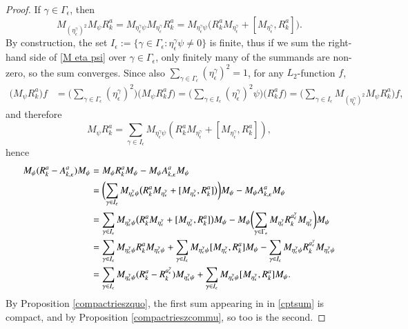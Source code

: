 \documentclass[leqno]{amsart}
\begin{document}
	\begin{proof}
		If $\gamma\in\Gamma_\epsilon$, then
		\begin{equation}\label{M eta psi}
			M_{(\eta^\gamma_\epsilon)^{2}}M_{\psi}R^a_k
			=M_{\eta^\gamma_\epsilon\psi}M_{\eta^\gamma_\epsilon}R^a_k=M_{\eta^\gamma_\epsilon\psi}\bigl(R^a_kM_{\eta^\gamma_\epsilon}+[M_{\eta^\gamma_\epsilon},R^a_k]\bigr).
		\end{equation}
		By construction, the set $I_\epsilon:=\{\gamma\in\Gamma_\epsilon : \eta^\gamma_\epsilon\psi\neq 0\}$ is finite, thus if we sum the right-hand side of \eqref{M eta psi} over $\gamma\in\Gamma_\epsilon$, only finitely many of the summands are non-zero, so the sum converges. Since also $\sum_{\gamma\in\Gamma_\epsilon}(\eta^\gamma_\epsilon)^2=1$, for any $L_2$-function $f$,
		\begin{align*}
			\biggl(M_{\psi}R^a_k\biggr)f&=\biggl(\sum_{\gamma\in\Gamma_\epsilon}(\eta^\gamma_\epsilon)^2\biggr)\biggl(M_{\psi}R^a_kf\biggr)=\biggl(\sum_{\gamma\in I_\epsilon}(\eta^\gamma_\epsilon)^2\psi \biggr)\biggl(R^a_kf\biggr)=\biggl(\sum_{\gamma\in I_\epsilon}M_{(\eta^\gamma_\epsilon)^{2}}M_{\psi}R^a_k\biggr)f,
		\end{align*}
		and therefore
		$$M_\psi R^a_k=\sum_{\gamma\in I_\epsilon}M_{\eta^\gamma_\epsilon\psi}(R^a_kM_{\eta^\gamma_\epsilon} + [M_{\eta^\gamma_\epsilon}, R^a_k]),$$
		hence
		\begin{align}
			\nonumber M_{\psi}({ R}^{a}_{k}-A^{a}_{k,\epsilon})M_{\psi}
   &=M_{\psi}{ R}^{a}_{k}M_\psi-M_\psi A^{a}_{k,\epsilon}M_{\psi}\\
   \nonumber&=\biggl(\sum_{\gamma\in I_\epsilon}M_{\eta^\gamma_\epsilon\psi}\bigl(R^a_kM_{\eta^\gamma_\epsilon} + [M_{\eta^\gamma_\epsilon}, R^a_k]\bigr)\biggr)M_\psi - M_\psi A^{a}_{k,\epsilon}M_{\psi}\\
			\nonumber &=\sum_{\gamma\in I_\epsilon}M_{\eta^\gamma_\epsilon\psi}\bigl(R^a_kM_{\eta^\gamma_\epsilon} + [M_{\eta^\gamma_\epsilon}, R^a_k]\bigr)M_\psi-M_\psi \biggl(\sum_{\gamma\in\Gamma_\epsilon} M_{\eta^\gamma_\epsilon} R^{a^\gamma_\epsilon}_kM_{\eta^\gamma_\epsilon}\biggr)M_{\psi}\\
			\nonumber &=\sum_{\gamma\in I_\epsilon}M_{\eta^\gamma_\epsilon\psi}R^a_kM_{\eta^\gamma_\epsilon\psi} + \sum_{\gamma\in I_\epsilon}M_{\eta^\gamma_\epsilon\psi}[M_{\eta^\gamma_\epsilon}, R^a_k]M_\psi-\sum_{\gamma\in I_\epsilon} M_{\eta^\gamma_\epsilon\psi} R^{a^\gamma_\epsilon}_kM_{\eta^\gamma_\epsilon\psi}\\
			\label{cptsum}&=\sum_{\gamma\in I_\epsilon}M_{\eta^\gamma_\epsilon\psi}(R^a_k-R^{a^\gamma_\epsilon}_k)M_{\eta^\gamma_\epsilon\psi} + \sum_{\gamma\in I_\epsilon}M_{\eta^\gamma_\epsilon\psi}[M_{\eta^\gamma_\epsilon}, R^a_k]M_\psi.
		\end{align}
		By Proposition \ref{compactrieszquo}, the first sum appearing in in \eqref{cptsum} is compact, and by Proposition \ref{compactrieszcommu}, so too is the second.
	\end{proof}
	
\end{document}
